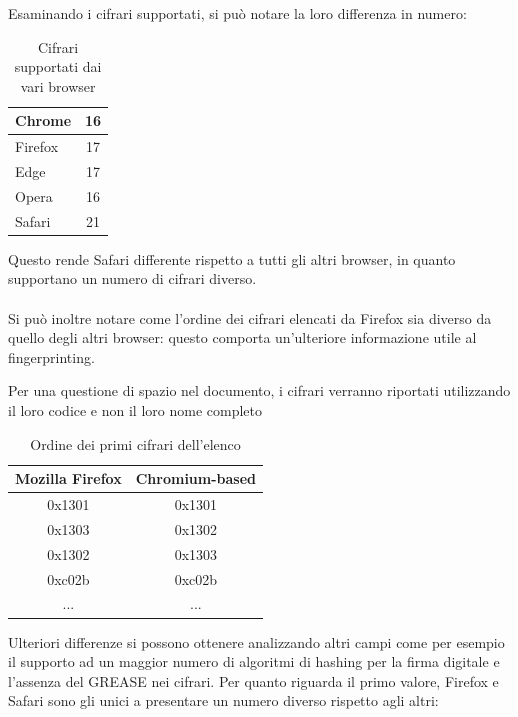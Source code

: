 Esaminando i cifrari supportati, si può notare la loro differenza in numero:
\\
\begin{table}[H]
	\centering
	\begin{tabular}{| l | c |}
		\hline
		\rowcolor[HTML]{FDD20A}Chrome & 16
		\\
		\hline
		\rowcolor[HTML]{FF9500}Firefox & 17
		\\
		\hline
		\rowcolor[HTML]{3277BC}Edge & 17
		\\
		\hline
		\rowcolor[HTML]{CB0B1E}Opera & 16
		\\
		\hline
		\rowcolor[HTML]{0FB5EE} Safari & 21
		\\
		\hline
		
	\end{tabular}
	\caption{Cifrari supportati dai vari browser}
	\label{tab:cifrari}
\end{table}
Questo rende Safari differente rispetto a tutti gli altri browser, in quanto supportano un numero di cifrari diverso.\\
\\
Si può inoltre notare come l'ordine dei cifrari elencati da Firefox sia diverso da quello degli altri browser: questo comporta un'ulteriore informazione utile al fingerprinting.

Per una questione di spazio nel documento, i cifrari verranno riportati utilizzando il loro codice e non il loro nome completo

\begin{table}[H]
	\centering
	\begin{tabular}{| c | c |}
		\hline
		\textbf{Mozilla Firefox} & \textbf{Chromium-based}
		\\
		\hline
		0x1301 & 0x1301
		\\
		\hline
		0x1303 & 0x1302
		\\
		\hline
		0x1302 & 0x1303
		\\
		\hline
		0xc02b & 0xc02b
		\\
		\hline
		... & ...
		\\
		\hline
		
	\end{tabular}
	\caption{Ordine dei primi cifrari dell'elenco}
	\label{tab:cifrari}
\end{table}

 


Ulteriori differenze si possono ottenere analizzando altri campi come per esempio il supporto ad un maggior numero di algoritmi di hashing per la firma digitale e l'assenza del GREASE nei cifrari. 
Per quanto riguarda il primo valore, Firefox e Safari sono gli unici a presentare un numero diverso rispetto agli altri:

